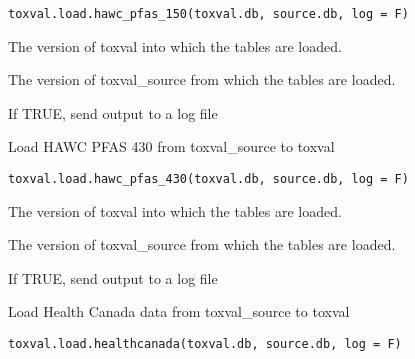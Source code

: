 \documentclass[letterpaper]{book}
\begin{document}
%
\begin{Usage}
\begin{verbatim}
toxval.load.hawc_pfas_150(toxval.db, source.db, log = F)
\end{verbatim}
\end{Usage}
%
\begin{Arguments}
\begin{ldescription}
\item[\code{toxval.db}] The version of toxval into which the tables are loaded.

\item[\code{source.db}] The version of toxval\_source from which the tables are loaded.

\item[\code{log}] If TRUE, send output to a log file
\end{ldescription}
\end{Arguments}
%
\begin{Description}\relax
Load HAWC PFAS 430 from toxval\_source to toxval
\end{Description}
%
\begin{Usage}
\begin{verbatim}
toxval.load.hawc_pfas_430(toxval.db, source.db, log = F)
\end{verbatim}
\end{Usage}
%
\begin{Arguments}
\begin{ldescription}
\item[\code{toxval.db}] The version of toxval into which the tables are loaded.

\item[\code{source.db}] The version of toxval\_source from which the tables are loaded.

\item[\code{log}] If TRUE, send output to a log file
\end{ldescription}
\end{Arguments}
%
\begin{Description}\relax
Load Health Canada data from toxval\_source to toxval
\end{Description}
%
\begin{Usage}
\begin{verbatim}
toxval.load.healthcanada(toxval.db, source.db, log = F)
\end{verbatim}
\end{Usage}
\end{document}
